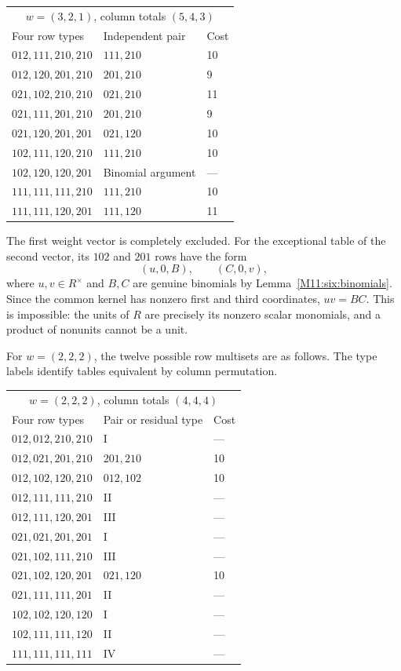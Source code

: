 \documentclass[11pt,a4paper,oneside]{report}
\theoremstyle{definition}
\theoremstyle{remark}
\begin{document}
\begin{center}
\small
\begin{tabular}{lll}
\hline
\multicolumn{3}{c}{\(w=(3,2,1)\), column totals \((5,4,3)\)}\\
Four row types & Independent pair & Cost\\
\hline
\(012,111,210,210\)&\(111,210\)&10\\
\(012,120,201,210\)&\(201,210\)&9\\
\(021,102,210,210\)&\(021,210\)&11\\
\(021,111,201,210\)&\(201,210\)&9\\
\(021,120,201,201\)&\(021,120\)&10\\
\(102,111,120,210\)&\(111,210\)&10\\
\(102,120,120,201\)&Binomial argument&---\\
\(111,111,111,210\)&\(111,210\)&10\\
\(111,111,120,201\)&\(111,120\)&11\\
\hline
\end{tabular}
\end{center}

The first weight vector is completely excluded. For the exceptional
table of the second vector, its \(102\) and \(201\) rows have the form
\[
 (u,0,B),\qquad (C,0,v),
\]
where \(u,v\in R^\times\) and \(B,C\) are genuine binomials by
Lemma~\ref{M11:six:binomials}. Since the common kernel has nonzero first
and third coordinates, \(uv=BC\). This is impossible: the units of
\(R\) are precisely its nonzero scalar monomials, and a product of
nonunits cannot be a unit.

For \(w=(2,2,2)\), the twelve possible row multisets are as follows.
The type labels identify tables equivalent by column permutation.

\begin{center}
\small
\begin{tabular}{lll}
\hline
\multicolumn{3}{c}{\(w=(2,2,2)\), column totals \((4,4,4)\)}\\
Four row types & Pair or residual type & Cost\\
\hline
\(012,012,210,210\)&I&---\\
\(012,021,201,210\)&\(201,210\)&10\\
\(012,102,120,210\)&\(012,102\)&10\\
\(012,111,111,210\)&II&---\\
\(012,111,120,201\)&III&---\\
\(021,021,201,201\)&I&---\\
\(021,102,111,210\)&III&---\\
\(021,102,120,201\)&\(021,120\)&10\\
\(021,111,111,201\)&II&---\\
\(102,102,120,120\)&I&---\\
\(102,111,111,120\)&II&---\\
\(111,111,111,111\)&IV&---\\
\hline
\end{tabular}
\end{center}
\end{document}
